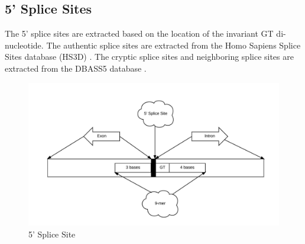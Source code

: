 \documentclass[12pt,a4paper]{article}
\begin{document}
    \subsection{5' Splice Sites}
    The 5’ splice sites are extracted based on the location of the invariant GT di-nucleotide. The authentic splice sites are extracted from the Homo Sapiens Splice Sites database (HS3D) \cite{hs3d-1,hs3d-2}. The cryptic splice sites and neighboring splice sites are extracted from the DBASS5 database \cite{dbass-0, dbass3}.
   	\begin{figure}[h]
   		\includegraphics[width=\textwidth]{fiveprime}
   		\caption{5' Splice Site}
   		\centering
   	\end{figure}
\end{document}
